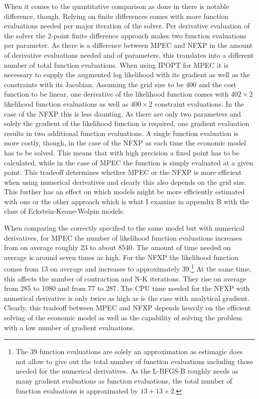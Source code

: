 When it comes to the quantitative comparison as done in \cite{Iskhakov.2016} there is notable difference, though. Relying on finite differences comes with more function evaluations needed per major iteration of the solver. Per derivative evaluation of the solver the 2-point finite difference approach makes two function evaluations per parameter. As there is a difference between MPEC and NFXP in the amount of derivative evaluations needed and of parameters, this translates into a different number of total function evaluations. When using IPOPT for MPEC it is necessary to supply the augmented log likelihood with its gradient as well as the constraints with its Jacobian. Assuming the grid size to be 400 and the cost function to be linear, one derivative of the likelihood function comes with $402 \times 2$ likelihood function evaluations as well as $400 \times 2$ constraint evaluations. In the case of the NFXP this is less daunting. As there are only two parameters and solely the gradient of the likelihood function is required, one gradient evaluation results in two additional function evaluations. A single function evaluation is more costly, though, in the case of the NFXP as each time the economic model has to be solved. This means that with high precision a fixed point has to be calculated, while in the case of MPEC the function is simply evaluated at a given point. This tradeoff determines whether MPEC or the NFXP is more efficient when using numerical derivatives and clearly this also depends on the grid size. This further has an effect on which models might be more efficiently estimated with one or the other approach which is what I examine in appendix B with the class of Eckstein-Keane-Wolpin models.

When comparing the correctly specified to the same model but with numerical derivatives, for MPEC the number of likelihood function evaluations increases from on average roughly 23 to about 8540. The amount of time needed on average is around seven times as high. For the NFXP the likelihood function comes from 13 on average and increases to approximately 39.\footnote{The 39 function evaluations are solely an approximation as estimagic does not allow to give out the total number of function evaluations including those needed for the numerical derivatives. As the L-BFGS-B roughly needs as many gradient evaluations as function evaluations, the total number of function evaluations is approximated by $13+13 \times 2$.} At the same time, this affects the number of contraction and N-K iterations. They rise on average from 285 to 1080 and from 77 to 287. The CPU time needed for the NFXP with numerical derivative is only twice as high as is the case with analytical gradient. Clearly, this tradeoff between MPEC and NFXP depends heavily on the efficient solving of the economic model as well as the capability of solving the problem with a low number of gradient evaluations.

